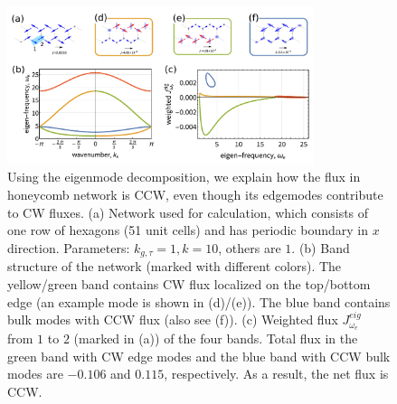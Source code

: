 \documentclass[
 amsmath,amssymb,
 aps,
 pre,
 longbibliography,
 10pt, onecolumn,
 notitlepage
]{revtex4-1}
\begin{document}
\begin{figure}[ht]
	\centering
	\includegraphics[width=0.8\textwidth]{eigen_modes.pdf}
    \caption{
        Using the eigenmode decomposition, we explain how the flux in honeycomb network is CCW, even though its edgemodes contribute to CW fluxes.
        (a) Network used for calculation, which consists of one row of hexagons (51 unit cells) and has periodic boundary in $x$ direction. Parameters: $k_{g,\tau}=1, k=10$, others are $1$.
        (b) Band structure of the network (marked with different colors). The yellow/green band contains CW flux localized on the top/bottom edge (an example mode is shown in (d)/(e)). The blue band contains bulk modes with CCW flux (also see (f)).
        (c) Weighted flux $J_{\omega_e}^{eig}$ from $1$ to $2$ (marked in (a)) of the four bands. Total flux in the green band with CW edge modes and the blue band with CCW bulk modes are $-0.106$ and $0.115$, respectively. As a result, the net flux is CCW.
    }
    \label{fig:eigen_modes}
\end{figure}
\end{document}
